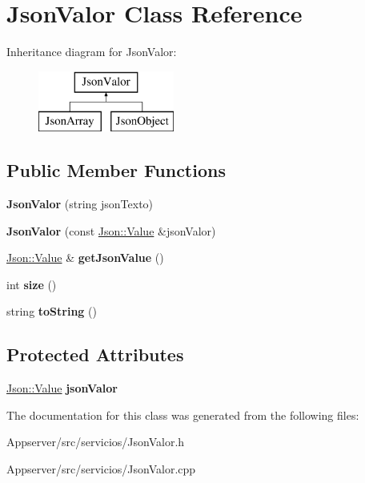 \hypertarget{classJsonValor}{}\section{Json\+Valor Class Reference}
\label{classJsonValor}
Inheritance diagram for Json\+Valor\+:\begin{figure}[H]
\begin{center}
\leavevmode
\includegraphics[height=2.000000cm]{classJsonValor}
\end{center}
\end{figure}
\subsection*{Public Member Functions}
\begin{DoxyCompactItemize}
\item 
{\bfseries Json\+Valor} (string json\+Texto)\hypertarget{classJsonValor_a7f772d055e8b997bcbb04c0d6ead9537}{}\label{classJsonValor_a7f772d055e8b997bcbb04c0d6ead9537}

\item 
{\bfseries Json\+Valor} (const \hyperlink{classJson_1_1Value}{Json\+::\+Value} \&json\+Valor)\hypertarget{classJsonValor_a4a28b4470b6efdcf08b9551fa713e02f}{}\label{classJsonValor_a4a28b4470b6efdcf08b9551fa713e02f}

\item 
\hyperlink{classJson_1_1Value}{Json\+::\+Value} \& {\bfseries get\+Json\+Value} ()\hypertarget{classJsonValor_aed661fdbe7cdd4cae14165a3c9ea8965}{}\label{classJsonValor_aed661fdbe7cdd4cae14165a3c9ea8965}

\item 
int {\bfseries size} ()\hypertarget{classJsonValor_a3743ad009175d884263a51ec659638f9}{}\label{classJsonValor_a3743ad009175d884263a51ec659638f9}

\item 
string {\bfseries to\+String} ()\hypertarget{classJsonValor_adcea7ce81e014bf14b67983c1bea3282}{}\label{classJsonValor_adcea7ce81e014bf14b67983c1bea3282}

\end{DoxyCompactItemize}
\subsection*{Protected Attributes}
\begin{DoxyCompactItemize}
\item 
\hyperlink{classJson_1_1Value}{Json\+::\+Value} {\bfseries json\+Valor}\hypertarget{classJsonValor_a9dc5f72fb7f56a1d6182f16e7ec8e696}{}\label{classJsonValor_a9dc5f72fb7f56a1d6182f16e7ec8e696}

\end{DoxyCompactItemize}


The documentation for this class was generated from the following files\+:\begin{DoxyCompactItemize}
\item 
Appserver/src/servicios/Json\+Valor.\+h\item 
Appserver/src/servicios/Json\+Valor.\+cpp\end{DoxyCompactItemize}

